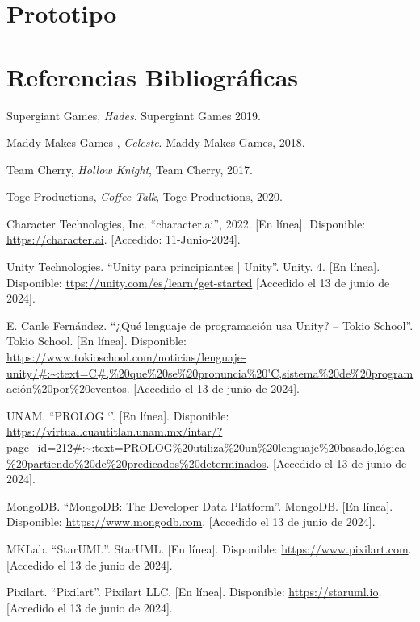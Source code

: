 \documentclass[12pt,twoside]{article}
\begin{document}
	\clearpage
	
	\section{Prototipo}

	\clearpage
	
	\section{Referencias Bibliográficas}
	
	\begin{thebibliography}{10}
	
	Supergiant Games, \textit{Hades}. Supergiant Games 2019.
	
	Maddy Makes Games , \textit{Celeste}. Maddy Makes Games, 2018.
	
	Team Cherry, \textit{Hollow Knight}, Team Cherry, 2017.
	
	Toge Productions, \textit{Coffee Talk}, Toge Productions, 2020.
	
	Character Technologies, Inc. ``character.ai'', 2022. [En línea]. Disponible: \url{https://character.ai}.  [Accedido: 11-Junio-2024].

	Unity Technologies. ``Unity para principiantes | Unity''. Unity. 4. [En línea]. Disponible: \url{ttps://unity.com/es/learn/get-started} [Accedido el 13 de junio de 2024].

	E. Canle Fernández. ``¿Qué lenguaje de programación usa Unity? – Tokio School”. Tokio School. [En línea]. Disponible: \url{https://www.tokioschool.com/noticias/lenguaje-unity/#:~:text=C#,%20que%20se%20pronuncia%20'C,sistema%20de%20programación%20por%20eventos}. [Accedido el 13 de junio de 2024].

	UNAM. ``PROLOG `'. [En línea]. Disponible: \url{https://virtual.cuautitlan.unam.mx/intar/?page_id=212#:~:text=PROLOG%20utiliza%20un%20lenguaje%20basado,lógica%20partiendo%20de%20predicados%20determinados}. [Accedido el 13 de junio de 2024].

	MongoDB. ``MongoDB: The Developer Data Platform''. MongoDB.  [En línea]. Disponible: \url{https://www.mongodb.com}. [Accedido el 13 de junio de 2024].

	MKLab.  ``StarUML''. StarUML. [En línea]. Disponible: \url{https://www.pixilart.com}. [Accedido el 13 de junio de 2024].
	
	Pixilart.  ``Pixilart''. Pixilart LLC. [En línea]. Disponible: \url{https://staruml.io}. [Accedido el 13 de junio de 2024].

	\end{thebibliography}
	
\end{document}
